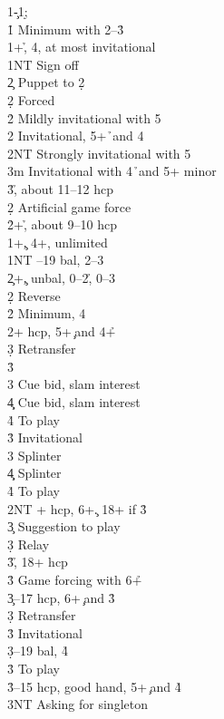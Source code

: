 \documentclass[a4paper]{article}
\begin{document}
\begin{bidtable}
1\c-1\d;\\
1\h \> Minimum with 2--3\h\+\\
1\s {}+\h, 4\s, at most invitational\\
1NT \> Sign off\\
2\c \> Puppet to 2\d\+\\
2\d \> Forced\+\\
2\h \> Mildly invitational with 5\h\\
2\s \> Invitational, 5+\h\ and 4\s\\
2NT \> Strongly invitational with 5\h\\
3m \> Invitational with 4\h\ and 5+ minor\\
3\h {}\h, about 11--12 hcp\-\-\\
2\d \> Artificial game force\\
2\h {}+\h, about 9--10 hcp\-\\
1\s {}+\c, 4+\s, unlimited\\
1NT --19 bal, 2--3\h\\
2\c {}+\c, unbal, 0--2\h, 0--3\s\\
2\d \> Reverse\\
2\h \> Minimum, 4\h\\
2\s {}+ hcp, 5+\c\ and 4+\h\+\\
3\d \> Retransfer\+\\
3\h\+\\
3\s \> Cue bid, slam interest\\
4\c\d \> Cue bid, slam interest\\
4\h \> To play\-\-\\
3\h \> Invitational\\
3\s \> Splinter\\
4\c\d \> Splinter\\
4\h \> To play\-\\
2NT + hcp, 6+\c. 18+ if 3\h\+\\
3\c \> Suggestion to play\\
3\d \> Relay\+\\
3\h {}\h, 18+ hcp\-\\
3\h \> Game forcing with 6+\h\-\\
3\c {}--17 hcp, 6+\c\ and 3\h\+\\
3\d \> Retransfer\\
3\h \> Invitational\-\\
3\d {}--19 bal, 4\h\+\\
3\h \> To play\-\\
3\h {}--15 hcp, good hand, 5+\c\ and 4\h\+\\
3NT \> Asking for singleton\-
\end{bidtable}
\end{document}
